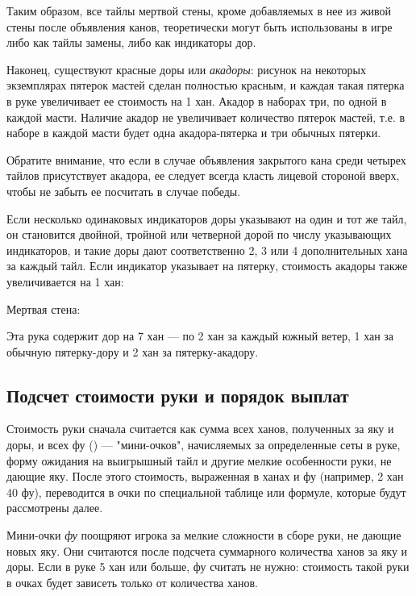 Таким образом, все тайлы мертвой стены, кроме добавляемых в нее из живой стены после объявления канов, теоретически могут быть использованы в игре либо как тайлы замены, либо как индикаторы дор.

Наконец, существуют красные доры или \textit{акадоры}: рисунок на некоторых экземплярах пятерок мастей сделан полностью красным, и каждая такая пятерка в руке увеличивает ее стоимость на 1 хан. Акадор в наборах три, по одной в каждой масти. Наличие акадор не увеличивает количество пятерок мастей, т.е. в наборе в каждой масти будет одна акадора-пятерка и три обычных пятерки.

Обратите внимание, что если в случае объявления закрытого кана среди четырех тайлов присутствует акадора, ее следует всегда класть лицевой стороной вверх, чтобы не забыть ее посчитать в случае победы.

Если несколько одинаковых индикаторов доры указывают на один и тот же тайл, он становится двойной, тройной или четверной дорой по числу указывающих индикаторов, и такие доры дают соответственно 2, 3 или 4 дополнительных хана за каждый тайл. Если индикатор указывает на пятерку, стоимость акадоры также увеличивается на 1 хан:


Мертвая стена:

Эта рука содержит дор на 7 хан --- по 2 хан за каждый южный ветер, 1 хан за обычную пятерку-дору и 2 хан за пятерку-акадору.

\subsection{Подсчет стоимости руки и порядок выплат}

Стоимость руки сначала считается как сумма всех ханов, полученных за яку и доры, и всех фу () --- "мини-очков", начисляемых за определенные сеты в руке, форму ожидания на выигрышный тайл и другие мелкие особенности руки, не дающие яку. После этого стоимость, выраженная в ханах и фу (например, 2 хан 40 фу), переводится в очки по специальной таблице или формуле, которые будут рассмотрены далее.

Мини-очки \textit{фу} поощряют игрока за мелкие сложности в сборе руки, не дающие новых яку. Они считаются после подсчета суммарного количества ханов за яку и доры. Если в руке 5 хан или больше, фу считать не нужно: стоимость такой руки в очках будет зависеть только от количества ханов.

